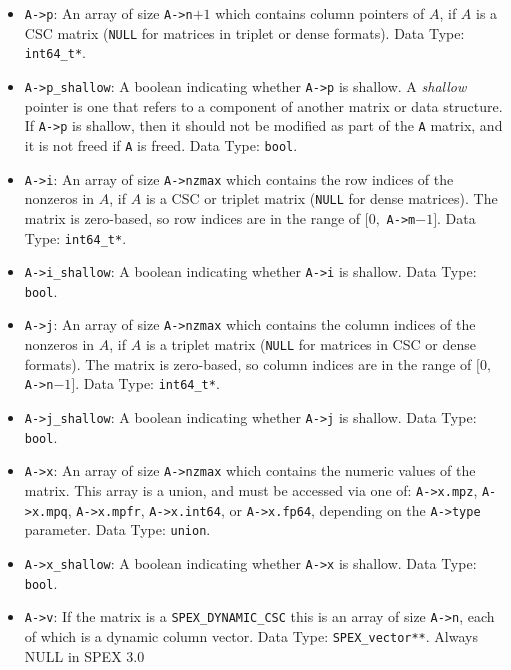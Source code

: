 \documentclass[12pt]{report}
\theoremstyle{definition}
\begin{document}
\begin{itemize}
\item \verb|A->p|: An array of size \verb|A->n|$+1$ which contains column pointers
of $A$, if $A$ is a CSC matrix (\verb|NULL| for matrices in triplet or dense
formats). Data Type: \verb|int64_t*|.

\item \verb|A->p_shallow|: A boolean indicating whether \verb|A->p| is shallow.
A {\em shallow} pointer is one that refers to a component of another matrix or
data structure.  If \verb|A->p| is shallow, then it should not be modified
as part of the \verb|A| matrix, and it is not freed if \verb|A| is freed.
Data Type: \verb|bool|.

\item \verb|A->i|: An array of size \verb|A->nzmax| which contains the row
indices of the nonzeros in $A$, if $A$ is a CSC or triplet matrix (\verb|NULL|
for dense matrices). The matrix is zero-based, so row indices are
in the range of $[0,$ \verb|A->m|$-1]$. Data Type: \verb|int64_t*|.

\item \verb|A->i_shallow|: A boolean indicating whether \verb|A->i| is shallow.
Data Type: \verb|bool|.

\item \verb|A->j|: An array of size \verb|A->nzmax| which contains the column
indices of the nonzeros in $A$, if $A$ is a triplet matrix (\verb|NULL| for
matrices in CSC or dense formats).
The matrix is zero-based, so column indices are
in the range of $[0,$ \verb|A->n|$-1]$. Data Type: \verb|int64_t*|.

\item \verb|A->j_shallow|: A boolean indicating whether \verb|A->j| is shallow.
Data Type: \verb|bool|.

\item \verb|A->x|: An array of size \verb|A->nzmax| which contains the
numeric values of the matrix.  This array is a union, and must be accessed via
one of: \verb|A->x.mpz|, \verb|A->x.mpq|, \verb|A->x.mpfr|, \verb|A->x.int64|,
or \verb|A->x.fp64|, depending on the \verb|A->type| parameter.
Data Type: \verb|union|.

\item \verb|A->x_shallow|: A boolean indicating whether \verb|A->x| is
shallow. Data Type: \verb|bool|.

\item \verb|A->v|: If the matrix is a \verb|SPEX_DYNAMIC_CSC| this is an array of size \verb|A->n|, each of which is a dynamic column vector. Data Type: \verb|SPEX_vector**|. Always NULL in SPEX 3.0
\end{itemize}
\end{document}
